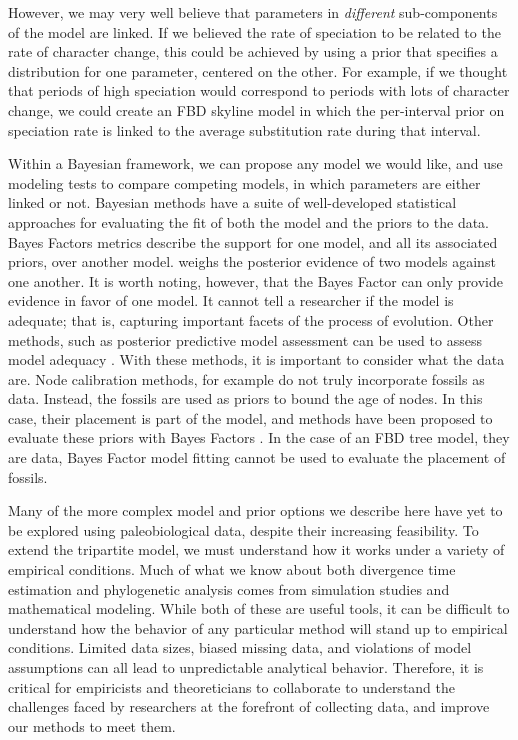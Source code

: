 However, we may very well believe that parameters in \textit{different} sub-components of the model are linked.
If we believed the rate of speciation to be related to the rate of character change,
this could be achieved by using a prior that specifies a distribution for one parameter, centered on the other.
For example, if we thought that periods of high speciation would correspond to periods with lots of character change, we could create an FBD skyline model in which the per-interval prior on speciation rate is linked to the average substitution rate during that interval.

Within a Bayesian framework, we can propose any model we would like, and use modeling tests to compare competing models, in which parameters are either linked or not.
Bayesian methods have a suite of well-developed statistical approaches for evaluating the fit of both the model and the priors to the data.
 Bayes Factors \citep{Xie2011}  metrics  describe the support for one model, and all its associated priors, over another model.
 weighs the posterior evidence of two models against one another.
It is worth noting, however, that the Bayes Factor can only provide evidence in favor of one model.
It cannot tell a researcher if the model is adequate; that is, capturing important facets of the process of evolution.
Other methods, such as posterior predictive model assessment can be used to assess model adequacy \citep{Brown2009, Brown2014, Duchene2015, Hoehna2018}.
With these methods, it is important to consider what the data are.
Node calibration methods, for example do not truly incorporate fossils as data.
Instead, the fossils are used as priors to bound the age of nodes.
In this case, their placement is part of the model, and methods have been proposed to evaluate these priors with Bayes Factors \citep{Andujar2014}. %
In the case of an FBD tree model, they are data,  Bayes Factor model fitting cannot be used to evaluate the placement of fossils.

Many of the more complex model and prior options we describe here have yet to be explored using paleobiological data, despite their increasing feasibility.
To extend the tripartite model, we must understand how it works under a variety of empirical conditions.
Much of what we know about both divergence time estimation and phylogenetic analysis comes from simulation studies and mathematical modeling.
While both of these are useful tools, it can be difficult to understand how the behavior of any particular method will stand up to empirical conditions.
Limited data sizes, biased missing data, and violations of model assumptions can all lead to unpredictable analytical behavior.
Therefore, it is critical for %
empiricists and theoreticians to collaborate to understand the challenges faced by researchers at the forefront of collecting data, and improve our methods to meet them.


